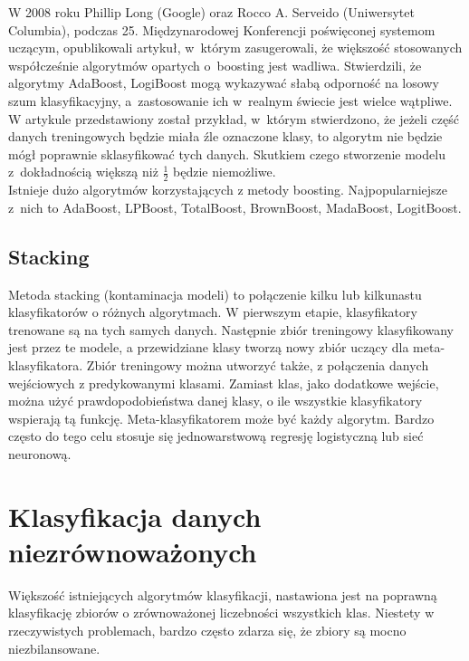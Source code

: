 W 2008 roku Phillip Long (Google) oraz Rocco A. Serveido (Uniwersytet Columbia), podczas 25. Międzynarodowej Konferencji poświęconej systemom uczącym, opublikowali artykuł, w którym zasugerowali, że większość stosowanych współcześnie algorytmów opartych o boosting jest wadliwa. Stwierdzili, że algorytmy AdaBoost, LogiBoost mogą wykazywać słabą odporność na losowy szum klasyfikacyjny, a zastosowanie ich w realnym świecie jest wielce wątpliwe. W artykule przedstawiony został przykład, w którym stwierdzono, że jeżeli część danych treningowych będzie miała źle oznaczone klasy, to algorytm nie będzie mógł poprawnie sklasyfikować tych danych. Skutkiem czego stworzenie modelu z dokładnością większą niż $\frac{1}{2}$ będzie niemożliwe. \\
Istnieje dużo algorytmów korzystających z metody boosting. Najpopularniejsze z nich to AdaBoost, LPBoost, TotalBoost, BrownBoost, MadaBoost, LogitBoost.
\subsection{Stacking}
Metoda stacking (kontaminacja modeli) to połączenie kilku lub kilkunastu klasyfikatorów o różnych algorytmach. W pierwszym etapie, klasyfikatory trenowane są na tych samych danych. Następnie zbiór treningowy klasyfikowany jest przez te modele, a przewidziane klasy tworzą nowy zbiór uczący dla meta-klasyfikatora. Zbiór treningowy można utworzyć także, z połączenia danych wejściowych z predykowanymi klasami. Zamiast klas, jako dodatkowe wejście, można użyć prawdopodobieństwa danej klasy, o ile wszystkie klasyfikatory wspierają tą funkcję. Meta-klasyfikatorem może być każdy algorytm. Bardzo często do tego celu stosuje się jednowarstwową regresję logistyczną lub sieć neuronową. 
\section{Klasyfikacja danych niezrównoważonych}
Większość istniejących algorytmów klasyfikacji, nastawiona jest na poprawną klasyfikację zbiorów o zrównoważonej liczebności wszystkich klas. Niestety w rzeczywistych problemach, bardzo często zdarza się, że zbiory są mocno niezbilansowane.
